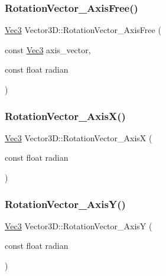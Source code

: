 \subsubsection{\texorpdfstring{Rotation\+Vector\+\_\+\+Axis\+Free()}{RotationVector\_AxisFree()}}
{\footnotesize\ttfamily \mbox{\hyperlink{_vector3_d_8h_ab16f59e4393f29a01ec8b9bbbabbe65d}{Vec3}} Vector3\+D\+::\+Rotation\+Vector\+\_\+\+Axis\+Free (\begin{DoxyParamCaption}\item[{const \mbox{\hyperlink{_vector3_d_8h_ab16f59e4393f29a01ec8b9bbbabbe65d}{Vec3}}}]{axis\+\_\+vector,  }\item[{const float}]{radian }\end{DoxyParamCaption})\hspace{0.3cm}{\ttfamily [inline]}}

\mbox{\label{class_vector3_d_a0b058c605bbea7ea97bd96efa3c0bc26}} 
\subsubsection{\texorpdfstring{Rotation\+Vector\+\_\+\+Axis\+X()}{RotationVector\_AxisX()}}
{\footnotesize\ttfamily \mbox{\hyperlink{_vector3_d_8h_ab16f59e4393f29a01ec8b9bbbabbe65d}{Vec3}} Vector3\+D\+::\+Rotation\+Vector\+\_\+\+AxisX (\begin{DoxyParamCaption}\item[{const float}]{radian }\end{DoxyParamCaption})\hspace{0.3cm}{\ttfamily [inline]}}

\mbox{\label{class_vector3_d_a0a8556c9bd5caef8592174a8c095080f}} 
\subsubsection{\texorpdfstring{Rotation\+Vector\+\_\+\+Axis\+Y()}{RotationVector\_AxisY()}}
{\footnotesize\ttfamily \mbox{\hyperlink{_vector3_d_8h_ab16f59e4393f29a01ec8b9bbbabbe65d}{Vec3}} Vector3\+D\+::\+Rotation\+Vector\+\_\+\+AxisY (\begin{DoxyParamCaption}\item[{const float}]{radian }\end{DoxyParamCaption})\hspace{0.3cm}{\ttfamily [inline]}}


